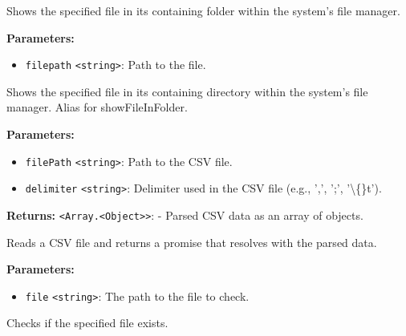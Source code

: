 \documentclass[12pt,a4paper]{article}
\begin{document}
\noindent Shows the specified file in its containing folder within the system's file manager.

\vspace{5mm}
\noindent {}


\noindent \textbf{Parameters:}
\begin{itemize}
  \item \texttt{filepath} \texttt{<string>}: Path to the file.
\end{itemize}

\noindent Shows the specified file in its containing directory within the system's file manager. Alias for \textasciigrave{}showFileInFolder\textasciigrave{}.

\vspace{5mm}
\noindent {}


\noindent \textbf{Parameters:}
\begin{itemize}
  \item \texttt{filePath} \texttt{<string>}: Path to the CSV file.
  \item \texttt{delimiter} \texttt{<string>}: Delimiter used in the CSV file (e.g., ',', ';', '\textbackslash\{\}t').
\end{itemize}

\noindent \textbf{Returns:} \texttt{<Array.<Object>>}: - Parsed CSV data as an array of objects.

\noindent Reads a CSV file and returns a promise that resolves with the parsed data.

\vspace{5mm}
\noindent {}


\noindent \textbf{Parameters:}
\begin{itemize}
  \item \texttt{file} \texttt{<string>}: The path to the file to check.
\end{itemize}

\noindent Checks if the specified file exists.

\vspace{5mm}
\noindent {}
\end{document}
